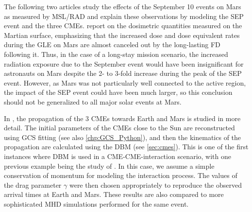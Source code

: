 The following two articles \citep{Zeitlin-2018,Guo-2018} study the effects of the September 10 events on Mars as measured by \ac{MSL}/\ac{RAD} and explain these observations by modeling the \ac{SEP} event and the three \acp{CME}. \citet{Zeitlin-2018} report on the dosimetric quantities measured on the Martian surface, emphasizing that the increased dose and dose equivalent rates during the \ac{GLE} on Mars are almost canceled out by the long-lasting \ac{FD} following it. Thus, in the case of a long-stay mission scenario, the increased radiation exposure due to the September event would have been insignificant for astronauts on Mars despite the 2- to 3-fold increase during the peak of the \ac{SEP} event. However, as Mars was not particularly well connected to the active region, the impact of the \ac{SEP} event could have been much larger, so this conclusion should not be generalized to all major solar events at Mars.

In \citet{Guo-2018}, the propagation of the 3 \acp{CME} towards Earth and Mars is studied in more detail. The initial parameters of the \acp{CME} close to the Sun are reconstructed using \ac{GCS} fitting (see also \autoref{chp:GCS_Python}), and then the kinematics of the propagation are calculated using the \ac{DBM} (see \autoref{sec:cmes}). This is one of the first instances where \ac{DBM} is used in a \ac{CME}-\ac{CME}-interaction scenario, with one previous example being the study of \citet{Temmer-2012}. In this case, we assume a simple conservation of momentum for modeling the interaction process. The values of the drag parameter $\gamma$ were then chosen appropriately to reproduce the observed arrival times at Earth and Mars. These results are also compared to more sophisticated \ac{MHD} simulations performed for the same event.\\


